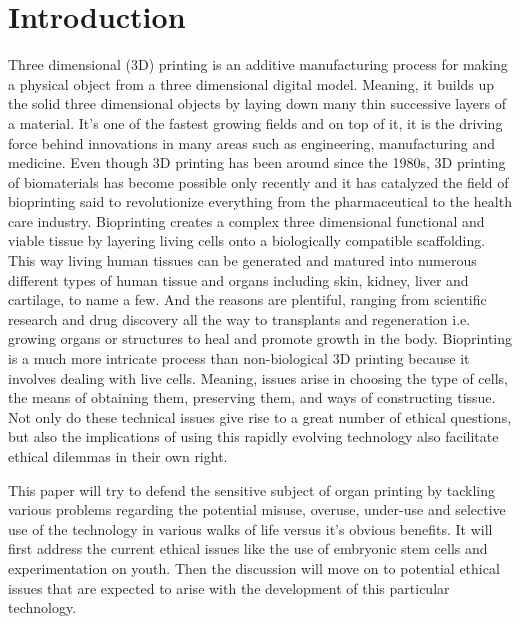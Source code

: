 \documentclass[12pt]{article} %
\begin{document}
\tableofcontents %

\newpage %



\section{Introduction} %

Three dimensional (3D) printing is an additive manufacturing process for making a physical object from a three dimensional digital model. Meaning, it builds up the solid three dimensional objects by laying down many thin successive layers of a material. It's one of the fastest growing fields and on top of it, it is the driving force behind innovations in many areas such as engineering, manufacturing and medicine. Even though 3D printing has been around since the 1980s, 3D printing of biomaterials has become possible only recently and it has catalyzed the field of bioprinting said to revolutionize everything from the pharmaceutical to the health care industry. Bioprinting creates a complex three dimensional functional and viable tissue by layering living cells onto a biologically compatible scaffolding. This way living human tissues can be generated and matured into numerous different types of human tissue and organs including skin, kidney, liver and cartilage, to name a few. And the reasons are plentiful, ranging from scientific research and drug discovery all the way to transplants and regeneration i.e. growing organs or structures to heal and promote growth in the body. Bioprinting is a much more intricate process than non-biological 3D printing because it involves dealing with live cells. Meaning, issues arise in choosing the type of cells, the means of obtaining them, preserving them, and ways of constructing tissue. Not only do these technical issues give rise to a great number of ethical questions, but also the implications of using this rapidly evolving technology also facilitate ethical dilemmas in their own right. 

This paper will try to defend the sensitive subject of organ printing by tackling various problems regarding the potential misuse, overuse, under-use and selective use of the technology in various walks of life versus it's obvious benefits. It will first address the current ethical issues like the use of embryonic stem cells and experimentation on youth. Then the discussion will move on to potential ethical issues that are expected to arise with the development of this particular technology.
\end{document}
